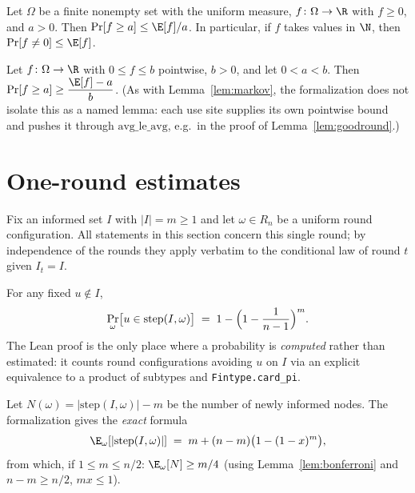 \begin{lemma}\label{lem:markov}
  \leanok
  Let $\Omega$ be a finite nonempty set with the uniform measure,
  $f \colon \Omega \to \R$ with $f \ge 0$, and $a > 0$. Then
  $\Pr[f \ge a] \le \E[f]/a$. In particular, if $f$ takes values in $\N$,
  then $\Pr[f \ne 0] \le \E[f]$.
\end{lemma}

\begin{lemma}\label{lem:revmarkov}
  \leanok
  Let $f \colon \Omega \to \R$ with $0 \le f \le b$ pointwise, $b > 0$, and
  let $0 < a < b$. Then $\Pr[f \ge a] \ge \dfrac{\E[f] - a}{b}$. (As with
  Lemma~\ref{lem:markov}, the formalization does not isolate this as a
  named lemma: each use site supplies its own pointwise bound and pushes it
  through $\mathrm{avg\_le\_avg}$, e.g.\ in the proof of
  Lemma~\ref{lem:goodround}.)
\end{lemma}

\section{One-round estimates}\label{sec:oneround}

Fix an informed set $I$ with $|I| = m \ge 1$ and let $\omega \in R_n$ be a
uniform round configuration. All statements in this section concern this
single round; by independence of the rounds they apply verbatim to the
conditional law of round $t$ given $I_t = I$.

\begin{lemma}\label{lem:contact}
  \leanok
  For any fixed $u \notin I$,
  \[
    \Pr_\omega\bigl[u \in \mathrm{step}(I,\omega)\bigr]
    \;=\; 1 - \Bigl(1-\frac{1}{n-1}\Bigr)^{m}.
  \]
  The Lean proof is the only place where a probability is \emph{computed}
  rather than estimated: it counts round configurations avoiding $u$ on $I$
  via an explicit equivalence to a product of subtypes and
  \texttt{Fintype.card\_pi}.
\end{lemma}

\begin{lemma}\label{lem:expgrowth}
  \leanok
  Let $N(\omega) = |\mathrm{step}(I,\omega)| - m$ be the number of newly
  informed nodes. The formalization gives the \emph{exact} formula
  \[
    \E_\omega[|\mathrm{step}(I,\omega)|] \;=\;
      m + (n-m)\bigl(1-(1-x)^m\bigr),
  \]
  from which, if $1 \le m \le n/2$: $\E_\omega[N] \ge m/4$ (using
  Lemma~\ref{lem:bonferroni} and $n - m \ge n/2$, $mx \le 1$).
\end{lemma}

